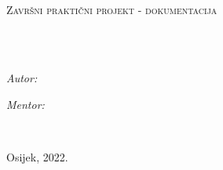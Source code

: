 \documentclass[
12pt, %
oneside, %
english, %
singlespacing, %
parskip, %
headsepline, %
chapterinoneline, %
consistentlayout, %
]{MastersDoctoralThesis} %
\author{Antonio Janjić} %
\begin{document}
\frontmatter %

\pagestyle{plain} %


\begin{titlepage}
	\begin{center}

		\vspace*{.06\textheight}
		{\scshape\univname\par}\vspace{0.5cm} %
		\Large\deptname\\\facname\\[1cm]
		\textsc{\Large Završni praktični projekt - dokumentacija}\\[0.5cm] %

		\HRule \\[0.4cm] %
		{\LARGE \bfseries \ttitle\par} %
		\HRule \\[1.5cm] %

		\begin{minipage}[t]{0.4\textwidth}
			\begin{flushleft} \large
				\emph{Autor:}\\
				\authorname

			\end{flushleft}
		\end{minipage}
		\begin{minipage}[t]{0.4\textwidth}
			\begin{flushright} \large
				\emph{Mentor:} \\
				\supname

			\end{flushright}
		\end{minipage}\\[3cm]

		\vfill

		{\large Osijek, 2022.} %

	\end{center}
\end{titlepage}
\end{document}
